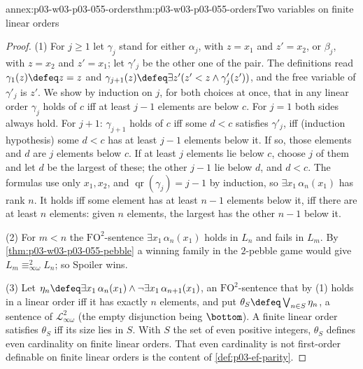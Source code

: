 \begin{annexitem}{annex:p03-w03-p03-055-orders}{thm:p03-w03-p03-055-orders}{Two variables on finite linear orders}
\begin{proof}
(1) For \(j\ge1\) let \(\gamma_j\) stand for either \(\alpha_j\), with
\(z=x_1\) and \(z'=x_2\), or \(\beta_j\), with \(z=x_2\) and \(z'=x_1\);
let \(\gamma'_j\) be the other one of the pair. The definitions read
\(\gamma_1(z)\defeq z=z\) and
\(\gamma_{j+1}(z)\defeq\exists z'(z'<z\wedge\gamma'_j(z'))\), and the free
variable of \(\gamma'_j\) is \(z'\). We show by induction on \(j\), for both
choices at once, that in any linear order \(\gamma_j\) holds of \(c\) iff at
least \(j-1\) elements are below \(c\). For \(j=1\) both sides always hold.
For \(j+1\): \(\gamma_{j+1}\) holds of \(c\) iff some \(d<c\) satisfies
\(\gamma'_j\), iff (induction hypothesis) some \(d<c\) has at least \(j-1\)
elements below it. If so, those elements and \(d\) are \(j\) elements below
\(c\). If at least \(j\) elements lie below \(c\), choose \(j\) of them and
let \(d\) be the largest of these; the other \(j-1\) lie below \(d\), and
\(d<c\). The formulas use only \(x_1,x_2\), and
\(\operatorname{qr}(\gamma_j)=j-1\) by induction, so
\(\exists x_1\,\alpha_n(x_1)\) has rank \(n\). It holds iff some element has
at least \(n-1\) elements below it, iff there are at least \(n\) elements:
given \(n\) elements, the largest has the other \(n-1\) below it.

(2) For \(m<n\) the \(\mathrm{FO}^2\)-sentence \(\exists x_1\,\alpha_n(x_1)\)
holds in \(L_n\) and fails in \(L_m\). By
\cref{thm:p03-w03-p03-055-pebble} a winning family in the \(2\)-pebble
game would give \(L_m\equiv^2_{\infty\omega}L_n\); so Spoiler wins.

(3) Let \(\eta_n\defeq\exists x_1\,\alpha_n(x_1)\wedge
\neg\exists x_1\,\alpha_{n+1}(x_1)\), an \(\mathrm{FO}^2\)-sentence that by
(1) holds in a linear order iff it has exactly \(n\) elements, and put
\(\theta_S\defeq\bigvee_{n\in S}\eta_n\), a sentence of
\(\mathcal L^2_{\infty\omega}\) (the empty disjunction being \(\bottom\)). A
finite linear order satisfies \(\theta_S\) iff its size lies in \(S\). With
\(S\) the set of even positive integers, \(\theta_S\) defines even
cardinality on finite linear orders. That even cardinality is not
first-order definable on finite linear orders is the content of
\cref{def:p03-ef-parity}.
\end{proof}
\end{annexitem}

